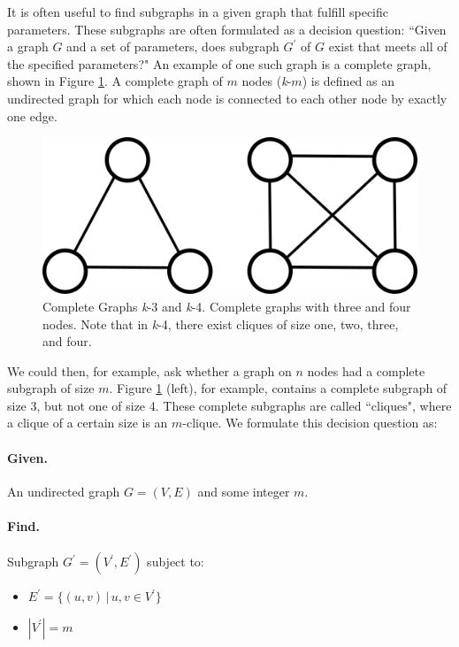 \documentclass[12pt,twoside]{reedthesis}
\theoremstyle{definition}
\begin{document}
   It is often useful to find subgraphs in a given graph that fulfill specific parameters. These subgraphs are often formulated as a decision question: ``Given a graph $G$ and a set of parameters, does subgraph $G^\prime$ of $G$ exist that meets all of the specified parameters?" An example of one such graph is a complete graph, shown in Figure \ref{fig:complete_graphs}. A complete graph of $m$ nodes (\textit{k}-$m$) is defined as an undirected graph for which each node is connected to each other node by exactly one edge.

   \begin{figure}[!h]
     \begin{center}
       \includegraphics[width=\textwidth/2]{complete_graphs}
     \caption[Complete Graphs \textit{k}-3 and \textit{k}-4.]{Complete Graphs \textit{k}-3 and \textit{k}-4. Complete graphs with three and four nodes. Note that in \textit{k}-4, there exist cliques of size one, two, three, and four.}
     \label{fig:complete_graphs}
     \end{center}
   \end{figure}

   We could then, for example, ask whether a graph on $n$ nodes had a complete subgraph of size $m$. Figure \ref{fig:complete_graphs} (left), for example, contains a complete subgraph of size 3, but not one of size 4. These complete subgraphs are called ``cliques", where a clique of a certain size is an $m$-clique. We formulate this decision question as:\par

   \bigbreak

   \hfill\begin{minipage}{\dimexpr\textwidth-2cm}
   \paragraph{Given.}An undirected graph $G=(V,E)$ and some integer $m$.
   \paragraph{Find.}Subgraph $G^\prime = (V^\prime,E^\prime)$ subject to:
   \begin{itemize}
     \item{$E^\prime = \{(u,v) \,|\, u,v \in V^\prime\}$}
     \item{$|V^\prime| = m$}
   \end{itemize}
\xdef\tpd{\the\prevdepth}
\end{minipage}
\end{document}
